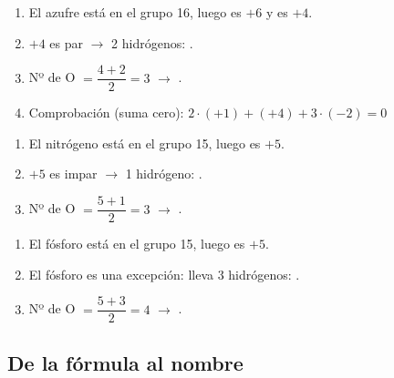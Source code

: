 \documentclass[12pt]{article}
\theoremstyle{mygreennumbox}
\begin{document}
\begin{ejemplo}
    \begin{enumerate}[label=\numberballgreen]
        \item El azufre está en el grupo 16, luego  es \(+6\) y  es \(+4\).
        \item \(+4\) es par \(\to\) 2 hidrógenos: .
        \item Nº de O \(= \dfrac{4+2}{2} = 3\) \(\to\) \textcolor{red}{}.
        \item Comprobación (suma cero): \(2\cdot(+1) + (+4) + 3\cdot(-2) = 0\) \checkmark
    \end{enumerate}
\end{ejemplo}

\begin{ejemplo}
    \begin{enumerate}[label=\numberballgreen]
        \item El nitrógeno está en el grupo 15, luego  es \(+5\).
        \item \(+5\) es impar \(\to\) 1 hidrógeno: .
        \item Nº de O \(= \dfrac{5+1}{2} = 3\) \(\to\) \textcolor{red}{}.
    \end{enumerate}
\end{ejemplo}

\begin{ejemplo}
    \begin{enumerate}[label=\numberballgreen]
        \item El fósforo está en el grupo 15, luego  es \(+5\).
        \item El fósforo es una excepción: lleva 3 hidrógenos: .
        \item Nº de O \(= \dfrac{5+3}{2} = 4\) \(\to\) \textcolor{red}{}.
    \end{enumerate}
\end{ejemplo}

\subsection{De la fórmula al nombre}
\end{document}
